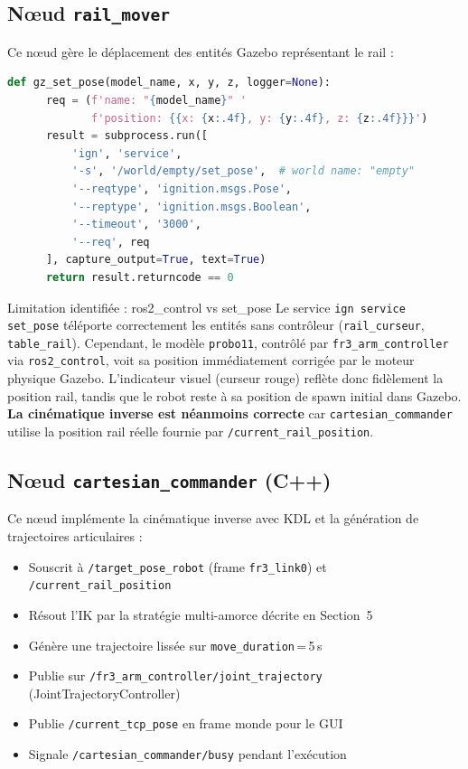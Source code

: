 \documentclass[11pt, a4paper]{article}
\newcommand{\topic}[1]{\texttt{\color{AccentOrange}#1}}
\begin{document}
\subsection{Nœud \texttt{rail\_mover}}

Ce nœud gère le déplacement des entités Gazebo représentant le rail :

\begin{lstlisting}[language=python, caption={Appel service Gazebo dans rail\_mover.py}]
  def gz_set_pose(model_name, x, y, z, logger=None):
      req = (f'name: "{model_name}" '
             f'position: {{x: {x:.4f}, y: {y:.4f}, z: {z:.4f}}}')
      result = subprocess.run([
          'ign', 'service',
          '-s', '/world/empty/set_pose',  # world name: "empty"
          '--reqtype', 'ignition.msgs.Pose',
          '--reptype', 'ignition.msgs.Boolean',
          '--timeout', '3000',
          '--req', req
      ], capture_output=True, text=True)
      return result.returncode == 0
\end{lstlisting}

\begin{warnbox}{Limitation identifiée : ros2\_control vs set\_pose}
Le service \texttt{ign service set\_pose} téléporte correctement les entités sans contrôleur (\texttt{rail\_curseur}, \texttt{table\_rail}). Cependant, le modèle \texttt{probo11}, contrôlé par \texttt{fr3\_arm\_controller} via \texttt{ros2\_control}, voit sa position immédiatement corrigée par le moteur physique Gazebo. L'indicateur visuel (curseur rouge) reflète donc fidèlement la position rail, tandis que le robot reste à sa position de spawn initial dans Gazebo. \textbf{La cinématique inverse est néanmoins correcte} car \texttt{cartesian\_commander} utilise la position rail réelle fournie par \topic{/current\_rail\_position}.
\end{warnbox}

\subsection{Nœud \texttt{cartesian\_commander} (C++)}

Ce nœud implémente la cinématique inverse avec KDL et la génération de trajectoires articulaires :

\begin{itemize}[leftmargin=1.5em, itemsep=3pt]
  \item Souscrit à \topic{/target\_pose\_robot} (frame \texttt{fr3\_link0}) et \topic{/current\_rail\_position}
  \item Résout l'IK par la stratégie multi-amorce décrite en Section~5
  \item Génère une trajectoire lissée sur \texttt{move\_duration}\,=\,5\,s
  \item Publie sur \topic{/fr3\_arm\_controller/joint\_trajectory} (JointTrajectoryController)
  \item Publie \topic{/current\_tcp\_pose} en frame monde pour le GUI
  \item Signale \topic{/cartesian\_commander/busy} pendant l'exécution
\end{itemize}
\end{document}
